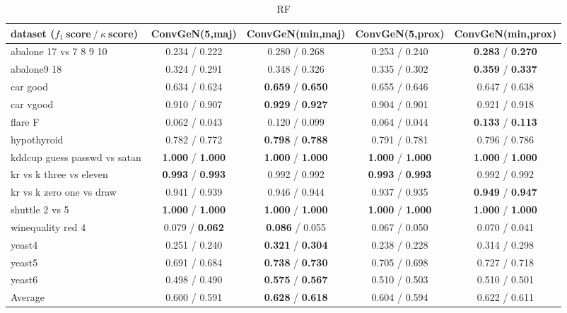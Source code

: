 
\begin{table*}[ht]\scriptsize\caption{RF}\label{tab:results:RF:A}\centering\tabularnewline
\begin{tabular}{l|@{\hskip3pt}c@{\hskip3pt}|@{\hskip3pt}c@{\hskip3pt}|@{\hskip3pt}c@{\hskip3pt}|@{\hskip3pt}c@{\hskip3pt}}\hline
\textbf{dataset ($f_1~$score$~/~\kappa~$score)} & \textbf{ConvGeN(5,maj)} & \textbf{ConvGeN(min,maj)} & \textbf{ConvGeN(5,prox)} & \textbf{ConvGeN(min,prox)}
\tabularnewline
\hline
abalone 17 vs 7 8 9 10 &  0.234  /  0.222  &  0.280  /  0.268  &  0.253  /  0.240  &  \textbf{0.283}  /  \textbf{0.270} 
\tabularnewline
abalone9 18 &  0.324  /  0.291  &  0.348  /  0.326  &  0.335  /  0.302  &  \textbf{0.359}  /  \textbf{0.337} 
\tabularnewline
car good &  0.634  /  0.624  &  \textbf{0.659}  /  \textbf{0.650}  &  0.655  /  0.646  &  0.647  /  0.638 
\tabularnewline
car vgood &  0.910  /  0.907  &  \textbf{0.929}  /  \textbf{0.927}  &  0.904  /  0.901  &  0.921  /  0.918 
\tabularnewline
flare F &  0.062  /  0.043  &  0.120  /  0.099  &  0.064  /  0.044  &  \textbf{0.133}  /  \textbf{0.113} 
\tabularnewline
hypothyroid &  0.782  /  0.772  &  \textbf{0.798}  /  \textbf{0.788}  &  0.791  /  0.781  &  0.796  /  0.786 
\tabularnewline
kddcup guess passwd vs satan &  \textbf{1.000}  /  \textbf{1.000}  &  \textbf{1.000}  /  \textbf{1.000}  &  \textbf{1.000}  /  \textbf{1.000}  &  \textbf{1.000}  /  \textbf{1.000} 
\tabularnewline
kr vs k three vs eleven &  \textbf{0.993}  /  \textbf{0.993}  &  0.992  /  0.992  &  \textbf{0.993}  /  \textbf{0.993}  &  0.992  /  0.992 
\tabularnewline
kr vs k zero one vs draw &  0.941  /  0.939  &  0.946  /  0.944  &  0.937  /  0.935  &  \textbf{0.949}  /  \textbf{0.947} 
\tabularnewline
shuttle 2 vs 5 &  \textbf{1.000}  /  \textbf{1.000}  &  \textbf{1.000}  /  \textbf{1.000}  &  \textbf{1.000}  /  \textbf{1.000}  &  \textbf{1.000}  /  \textbf{1.000} 
\tabularnewline
winequality red 4 &  0.079  /  \textbf{0.062}  &  \textbf{0.086}  /  0.055  &  0.067  /  0.050  &  0.070  /  0.041 
\tabularnewline
yeast4 &  0.251  /  0.240  &  \textbf{0.321}  /  \textbf{0.304}  &  0.238  /  0.228  &  0.314  /  0.298 
\tabularnewline
yeast5 &  0.691  /  0.684  &  \textbf{0.738}  /  \textbf{0.730}  &  0.705  /  0.698  &  0.727  /  0.718 
\tabularnewline
yeast6 &  0.498  /  0.490  &  \textbf{0.575}  /  \textbf{0.567}  &  0.510  /  0.503  &  0.510  /  0.501 
\tabularnewline
\hline Average &  0.600  /  0.591  &  \textbf{0.628}  /  \textbf{0.618}  &  0.604  /  0.594  &  0.622  /  0.611 
\tabularnewline
\hline\end{tabular}\end{table*}


